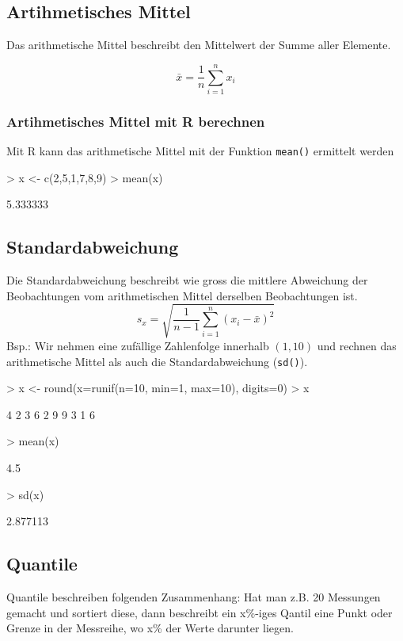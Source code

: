 \subsection{Artihmetisches Mittel}
Das arithmetische Mittel beschreibt den Mittelwert der Summe aller Elemente.

\[ \bar{x} = \frac{1}{n} \sum\limits_{i=1}^{n} x_i \]

\subsubsection{Artihmetisches Mittel mit R berechnen}
Mit R kann das arithmetische Mittel mit der Funktion \verb!mean()! 
ermittelt werden
\begin{Schunk}
\begin{Sinput}
> x <- c(2,5,1,7,8,9)
> mean(x)
\end{Sinput}
\begin{Soutput}
[1] 5.333333
\end{Soutput}
\end{Schunk}

\subsection{Standardabweichung}
Die Standardabweichung beschreibt wie gross die mittlere Abweichung der
Beobachtungen vom arithmetischen Mittel derselben Beobachtungen ist.
\[ s_x = \sqrt{ \frac{1}{n-1} \sum\limits_{i=1}^{n} (x_i - \bar{x})^2 } \]
Bsp.: Wir nehmen eine zufällige Zahlenfolge innerhalb $(1,10)$ und
rechnen das arithmetische Mittel als auch die Standardabweichung (\verb!sd()!).
\begin{Schunk}
\begin{Sinput}
> x <- round(x=runif(n=10, min=1, max=10), digits=0)
> x
\end{Sinput}
\begin{Soutput}
 [1] 4 2 3 6 2 9 9 3 1 6
\end{Soutput}
\begin{Sinput}
> mean(x)
\end{Sinput}
\begin{Soutput}
[1] 4.5
\end{Soutput}
\begin{Sinput}
> sd(x)
\end{Sinput}
\begin{Soutput}
[1] 2.877113
\end{Soutput}
\end{Schunk}

\subsection{Quantile}
Quantile beschreiben folgenden Zusammenhang: Hat man z.B. 20 Messungen gemacht
und sortiert diese, dann beschreibt ein x\%-iges Qantil eine Punkt oder Grenze
in der Messreihe, wo x\% der Werte darunter liegen.

